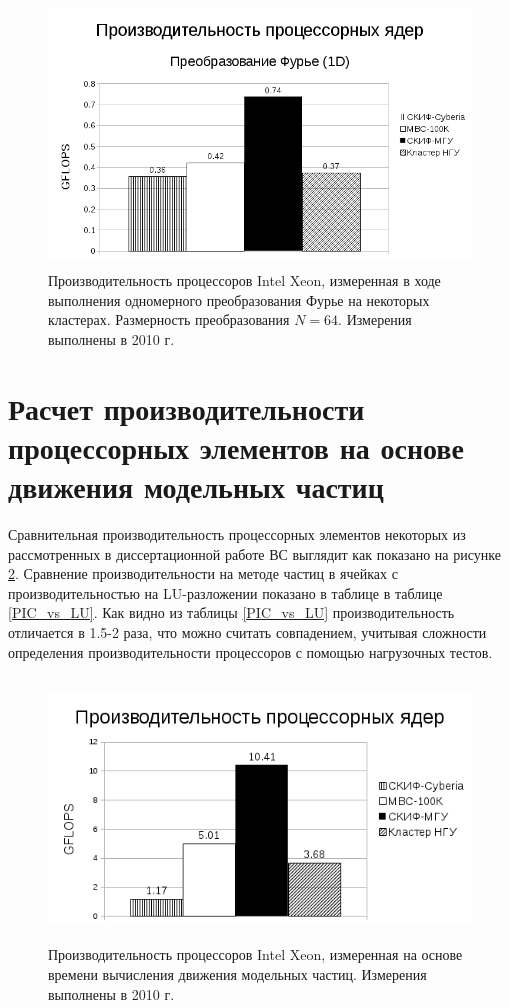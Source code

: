 \begin{figure}[htb]
	\begin{center}
		\includegraphics[height=7cm,keepaspectratio]{images/processor_FLOPS.png}
	\end{center}
	\caption{Производительность процессоров Intel Xeon, измеренная в ходе выполнения одномерного преобразования Фурье на некоторых кластерах. Размерность преобразования $N=64$. Измерения выполнены в 2010 г.}
	\label{procs_flops}
\end{figure} 


\section{Расчет производительности процессорных элементов на основе движения модельных частиц}
\label{calc_PE}
 Сравнительная производительность процессорных элементов некоторых из рассмотренных в диссертационной работе ВС выглядит как показано на рисунке  \ref{procs_flops_pic}.  Сравнение производительности 
 на методе частиц в ячейках с производительностью на LU-разложении показано в таблице в таблице \ref{PIC_vs_LU}. Как видно из таблицы \ref{PIC_vs_LU} производительность отличается в 1.5-2 раза, что можно считать совпадением, учитывая сложности определения производительности процессоров с помощью нагрузочных тестов. 
   
\begin{figure}[htb]
	\begin{center}
		\includegraphics[height=7cm,keepaspectratio]{images/processor_FLOPS_PIC.png}
	\end{center}
	\caption{Производительность процессоров Intel Xeon, измеренная на основе времени вычисления движения модельных частиц. Измерения выполнены в 2010 г.}
	\label{procs_flops_pic}
\end{figure} 

